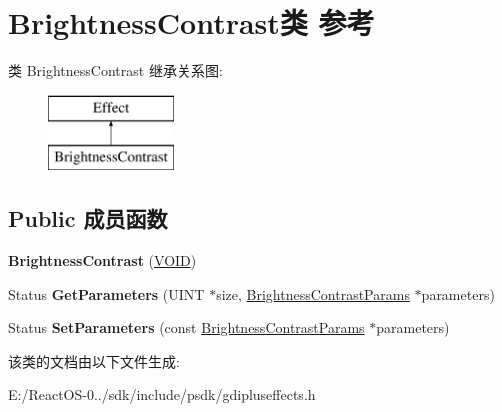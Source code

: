 \hypertarget{class_brightness_contrast}{}\section{Brightness\+Contrast类 参考}
\label{class_brightness_contrast}
类 Brightness\+Contrast 继承关系图\+:\begin{figure}[H]
\begin{center}
\leavevmode
\includegraphics[height=2.000000cm]{class_brightness_contrast}
\end{center}
\end{figure}
\subsection*{Public 成员函数}
\begin{DoxyCompactItemize}
\item 
\mbox{\label{class_brightness_contrast_a9e0340d62e381b4e5b4531a7263a2587}} 
{\bfseries Brightness\+Contrast} (\hyperlink{interfacevoid}{V\+O\+ID})
\item 
\mbox{\label{class_brightness_contrast_ad3ed816a9604ef191d6a843dd5c025d5}} 
Status {\bfseries Get\+Parameters} (U\+I\+NT $\ast$size, \hyperlink{struct_brightness_contrast_params}{Brightness\+Contrast\+Params} $\ast$parameters)
\item 
\mbox{\label{class_brightness_contrast_a2949cea165b0441846115b125e7ab54f}} 
Status {\bfseries Set\+Parameters} (const \hyperlink{struct_brightness_contrast_params}{Brightness\+Contrast\+Params} $\ast$parameters)
\end{DoxyCompactItemize}


该类的文档由以下文件生成\+:\begin{DoxyCompactItemize}
\item 
E\+:/\+React\+O\+S-\/0../sdk/include/psdk/gdipluseffects.\+h\end{DoxyCompactItemize}
